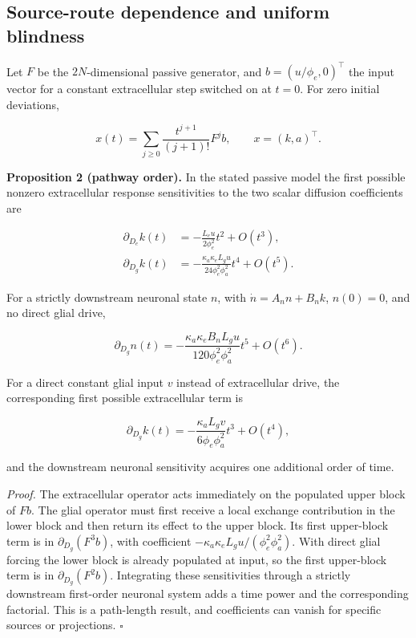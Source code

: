 \documentclass[
  11pt,
]{article}
\begin{document}
\subsection{Source-route dependence and uniform
blindness}\label{source-route-dependence-and-uniform-blindness}

Let \(F\) be the \(2N\)-dimensional passive generator, and
\(b=(u/\phi_e,0)^\top\) the input vector for a constant extracellular
step switched on at \(t=0\). For zero initial deviations,

\[x(t)=\sum_{j\geq0}\frac{t^{j+1}}{(j+1)!}F^j b,\qquad x=(k,a)^\top.\]

\textbf{Proposition 2 (pathway order).} In the stated passive model the
first possible nonzero extracellular response sensitivities to the two
scalar diffusion coefficients are

\[\begin{aligned}
\partial_{D_e}k(t)&=-\frac{L_eu}{2\phi_e^2}t^2+O(t^3),\\
\partial_{D_g}k(t)&=-\frac{\kappa_a\kappa_e L_gu}{24\phi_e^2\phi_a^2}t^4+O(t^5).
\end{aligned}\]

For a strictly downstream neuronal state \(n\), with
\(\dot n=A_nn+B_nk\), \(n(0)=0\), and no direct glial drive,

\[\partial_{D_g}n(t)=-\frac{\kappa_a\kappa_e B_nL_gu}{120\phi_e^2\phi_a^2}t^5+O(t^6).\]

For a direct constant glial input \(v\) instead of extracellular drive,
the corresponding first possible extracellular term is

\[\partial_{D_g}k(t)=-\frac{\kappa_a L_gv}{6\phi_e\phi_a^2}t^3+O(t^4),\]

and the downstream neuronal sensitivity acquires one additional order of
time.

\emph{Proof.} The extracellular operator acts immediately on the
populated upper block of \(Fb\). The glial operator must first receive a
local exchange contribution in the lower block and then return its
effect to the upper block. Its first upper-block term is in
\(\partial_{D_g}(F^3b)\), with coefficient
\(-\kappa_a\kappa_e L_gu/(\phi_e^2\phi_a^2)\). With direct glial forcing
the lower block is already populated at input, so the first upper-block
term is in \(\partial_{D_g}(F^2b)\). Integrating these sensitivities
through a strictly downstream first-order neuronal system adds a time
power and the corresponding factorial. This is a path-length result, and
coefficients can vanish for specific sources or projections. \(\square\)
\end{document}
